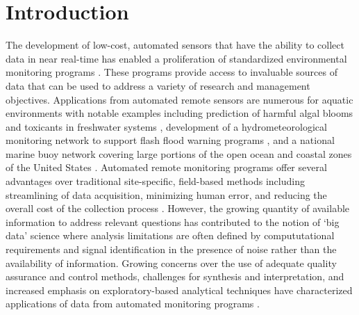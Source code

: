 \documentclass[10pt,letterpaper]{article}\usepackage[]{graphicx}\usepackage[]{color}
\begin{document}
\linenumbers

\section*{Introduction}

The development of low-cost, automated sensors that have the ability to collect data in near real-time has enabled a proliferation of standardized environmental monitoring programs \cite{Glasgow04,Fries08}.  These programs provide access to invaluable sources of data that can be used to address a variety of research and management objectives.  Applications from automated remote sensors are numerous for aquatic environments with notable examples including prediction of harmful algal blooms and toxicants in freshwater systems \cite{Reed10}, development of a hydrometeorological monitoring network to support flash flood warning programs \cite{HADS15}, and a national marine buoy network covering large portions of the open ocean and coastal zones of the United States \cite{NDBC15}.  Automated remote monitoring programs offer several advantages over traditional site-specific, field-based methods including streamlining of data acquisition, minimizing human error, and reducing the overall cost of the collection process \cite{Glasgow04}.  However, the growing quantity of available information to address relevant questions has contributed to the notion of `big data' science where analysis limitations are often defined by compututational requirements and signal identification in the presence of noise rather than the availability of information.  Growing concerns over the use of adequate quality assurance and control methods, challenges for synthesis and interpretation, and increased emphasis on exploratory-based analytical techniques have characterized applications of data from automated monitoring programs \cite{Campbell13,Millie13}.
\end{document}
